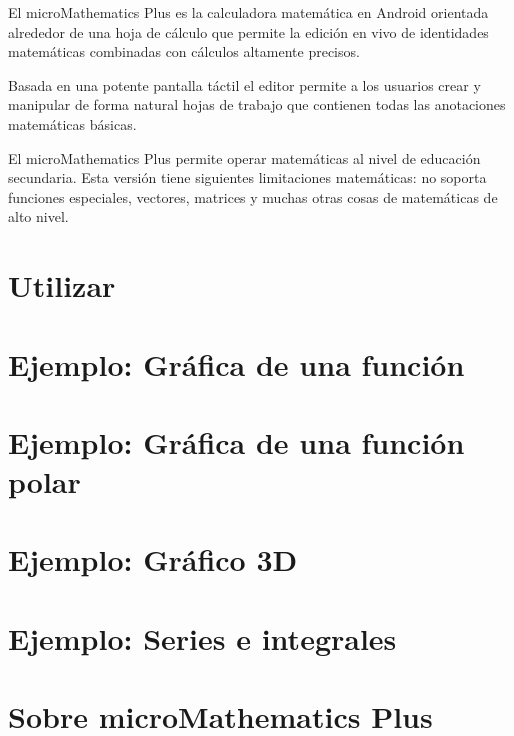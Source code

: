 \documentclass[DIV=calc, paper=a4, fontsize=11pt, twocolumn]{scrartcl}
\begin{document}
\maketitle
\thispagestyle{fancy} %

\begin{bf}
El microMathematics Plus es la
calculadora matemática en Android
orientada alrededor de una hoja de cálculo que
permite la edición en vivo de identidades matemáticas
combinadas con cálculos altamente
precisos.

Basada en una potente pantalla táctil
el editor permite a los usuarios crear y
manipular de forma natural
hojas de trabajo que contienen todas las
anotaciones matemáticas básicas.

El microMathematics Plus permite
operar matemáticas al nivel de educación
secundaria. Esta versión tiene
siguientes limitaciones matemáticas: no soporta funciones especiales,
vectores, matrices y muchas otras
cosas de matemáticas de alto nivel.
\end{bf}

\section{Utilizar}


\section{Ejemplo: Gráfica de una función}


\section{Ejemplo: Gráfica de una función polar}


\section{Ejemplo: Gráfico 3D}


\section{Ejemplo: Series e integrales}


\section{Sobre microMathematics Plus}
\end{document}
